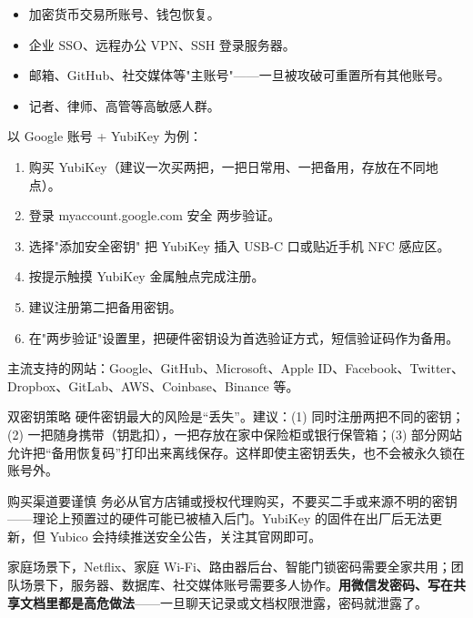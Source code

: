 
\begin{itemize}
  \item 加密货币交易所账号、钱包恢复。
  \item 企业 SSO、远程办公 VPN、SSH 登录服务器。
  \item 邮箱、GitHub、社交媒体等"主账号"——一旦被攻破可重置所有其他账号。
  \item 记者、律师、高管等高敏感人群。
\end{itemize}


以 Google 账号 + YubiKey 为例：

\begin{enumerate}
  \item 购买 YubiKey（建议一次买两把，一把日常用、一把备用，存放在不同地点）。
  \item 登录 myaccount.google.com 安全 两步验证。
  \item 选择"添加安全密钥" 把 YubiKey 插入 USB-C 口或贴近手机 NFC 感应区。
  \item 按提示触摸 YubiKey 金属触点完成注册。
  \item 建议注册第二把备用密钥。
  \item 在"两步验证"设置里，把硬件密钥设为首选验证方式，短信验证码作为备用。
\end{enumerate}

主流支持的网站：Google、GitHub、Microsoft、Apple ID、Facebook、Twitter、Dropbox、GitLab、AWS、Coinbase、Binance 等。

\begin{tcbinfo}{双密钥策略}
硬件密钥最大的风险是“丢失”。建议：(1) 同时注册两把不同的密钥；(2) 一把随身携带（钥匙扣），一把存放在家中保险柜或银行保管箱；(3) 部分网站允许把“备用恢复码”打印出来离线保存。这样即使主密钥丢失，也不会被永久锁在账号外。

\end{tcbinfo}

\begin{tcbwarn}{购买渠道要谨慎}
务必从官方店铺或授权代理购买，不要买二手或来源不明的密钥——理论上预置过的硬件可能已被植入后门。YubiKey 的固件在出厂后无法更新，但 Yubico 会持续推送安全公告，关注其官网即可。

\end{tcbwarn}


家庭场景下，Netflix、家庭 Wi-Fi、路由器后台、智能门锁密码需要全家共用；团队场景下，服务器、数据库、社交媒体账号需要多人协作。\textbf{用微信发密码、写在共享文档里都是高危做法}——一旦聊天记录或文档权限泄露，密码就泄露了。

